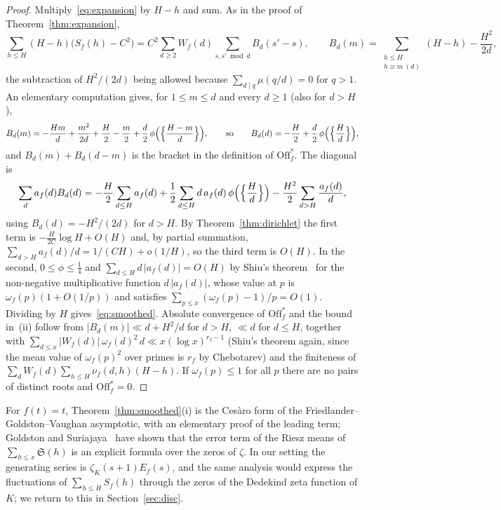 \documentclass[11pt,a4paper]{article}
\theoremstyle{remark}\newtheorem{remark}[theorem]{Remark}
\newcommand{\Sig}{\mathfrak S}
\begin{document}
\begin{proof}
Multiply~\eqref{eq:expansion} by $H-h$ and sum. As in the proof of Theorem~\ref{thm:expansion},
\[
\sum_{h\le H}(H-h)\bigl(S_f(h)-C^2\bigr)=C^2\sum_{d\ge2}W_f(d)\sum_{s,s'\bmod d}B_d(s'-s),\qquad
B_d(m)=\sum_{\substack{h\le H\\h\equiv m\ (d)}}(H-h)-\frac{H^2}{2d},
\]
the subtraction of $H^2/(2d)$ being allowed because $\sum_{d\mid q}\mu(q/d)=0$ for $q>1$. An elementary
computation gives, for $1\le m\le d$ and every $d\ge1$ (also for $d>H$),
\[
B_d(m)=-\frac{Hm}d+\frac{m^2}{2d}+\frac H2-\frac m2+\frac d2\,\phi\Bigl(\Bigl\{\frac{H-m}d\Bigr\}\Bigr),
\qquad\text{so}\qquad
B_d(d)=-\frac H2+\frac d2\,\phi\Bigl(\Bigl\{\frac Hd\Bigr\}\Bigr),
\]
and $B_d(m)+B_d(d-m)$ is the bracket in the definition of $\mathrm{Off}^\ast_f$. The diagonal is
\[
\sum_d a_f(d)B_d(d)=-\frac H2\sum_{d\le H}a_f(d)+\frac12\sum_{d\le H}d\,a_f(d)\,\phi\Bigl(\Bigl\{\frac Hd\Bigr\}\Bigr)-\frac{H^2}2\sum_{d>H}\frac{a_f(d)}d,
\]
using $B_d(d)=-H^2/(2d)$ for $d>H$. By Theorem~\ref{thm:dirichlet} the first term is
$-\frac{H}{2C}\log H+O(H)$ and, by partial summation, $\sum_{d>H}a_f(d)/d=1/(CH)+o(1/H)$, so the third
term is $O(H)$. In the second, $0\le\phi\le\tfrac14$ and $\sum_{d\le H}d\,|a_f(d)|=O(H)$ by Shiu's
theorem~\cite{Shiu1980} for the non-negative multiplicative function $d\,|a_f(d)|$, whose value at $p$
is $\omega_f(p)(1+O(1/p))$ and satisfies $\sum_{p\le x}(\omega_f(p)-1)/p=O(1)$. Dividing by $H$
gives~\eqref{eq:smoothed}. Absolute convergence of $\mathrm{Off}^\ast_f$ and the bound in~(ii) follow
from $|B_d(m)|\ll d+H^2/d$ for $d>H$, $\ll d$ for $d\le H$, together with
$\sum_{d\le x}|W_f(d)|\,\omega_f(d)^2\,d\ll x(\log x)^{r_f-1}$ (Shiu's theorem again, since the mean
value of $\omega_f(p)^2$ over primes is $r_f$ by Chebotarev) and the finiteness of
$\sum_d W_f(d)\sum_{h\le H}\nu_f(d,h)(H-h)$. If $\omega_f(p)\le1$ for all $p$ there are no pairs of
distinct roots and $\mathrm{Off}^\ast_f=0$.
\end{proof}

For $f(t)=t$, Theorem~\ref{thm:smoothed}(i) is the Ces\`aro form of the Friedlander--Goldston--Vaughan
asymptotic, with an elementary proof of the leading term; Goldston and
Suriajaya~\cite{GoldstonSuriajaya2021,GoldstonSuriajaya2021b} have shown that the error term of the
Riesz means of $\sum_{h\le x}\Sig(h)$ is an explicit formula over the zeros of $\zeta$. In our setting the
generating series is $\zeta_K(s+1)E_f(s)$, and the same analysis would express the fluctuations of
$\sum_{h\le H}S_f(h)$ through the zeros of the Dedekind zeta function of $K$; we return to this in
Section~\ref{sec:disc}.
\end{document}
